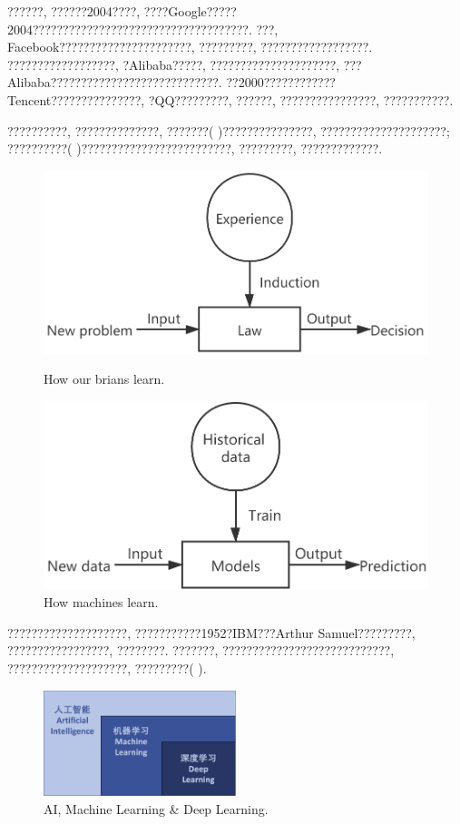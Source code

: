 \documentclass[lang=cn,11pt,a4paper]{elegantpaper}
\begin{document}
\par ??????, ??????2004????, ????Google?????2004????????????????????????????????????. ???, Facebook??????????????????????, ?????????, ??????????????????. ??????????????????, ?Alibaba?????, ?????????????????????, ???Alibaba????????????????????????????. ??2000????????????Tencent???????????????, ?QQ?????????, ??????, ????????????????, ???????????.
\par ??????????, ??????????????, ???????( )???????????????, ?????????????????????; ??????????( )?????????????????????????, ?????????, ?????????????. 
\begin{figure}[htbp]
	\centering
	\begin{minipage}[t]{0.45\textwidth}
	\centering
	\includegraphics[width=1\textwidth]{Brian}
	\caption{How our brians learn.\label{fig:Brian}}
	\end{minipage}
	\begin{minipage}[t]{0.45\textwidth}
	\centering
	\includegraphics[width=1\textwidth]{Machine}
	\caption{How machines learn.\label{fig:Machine}}
	\end{minipage}
\end{figure}
\par ????????????????????, ???????????1952?IBM???Arthur Samuel?????????, ?????????????????, ????????\cite{AS1}\cite{AS2}. ???????, ????????????????????????????, ????????????????????, ?????????( ).
\begin{figure}[htbp]
	\centering
	\includegraphics[width=0.5\textwidth]{AI}
  	\caption{AI, Machine Learning \& Deep Learning.\label{fig:AI}}
\end{figure}
\end{document}
